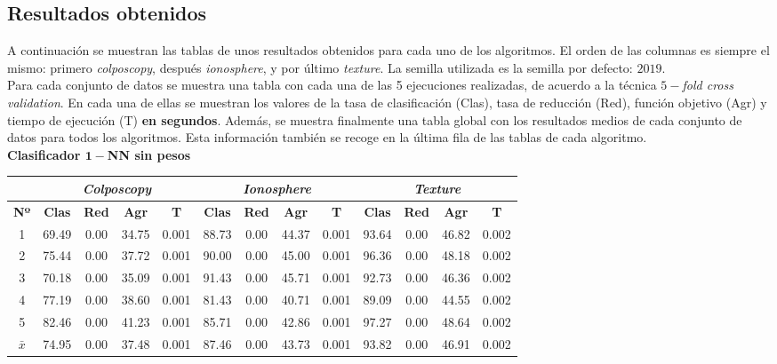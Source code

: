 \documentclass[12pt]{article}
\begin{document}
\subsection*{Resultados obtenidos}
\label{resultados}

A continuación se muestran las tablas de unos resultados obtenidos para cada uno de los algoritmos. El orden de las columnas es siempre el mismo: primero \textit{colposcopy}, después \textit{ionosphere}, y por último \textit{texture}. La semilla utilizada es la semilla por defecto: $2019$.\\

Para cada conjunto de datos se muestra una tabla con cada una de las 5 ejecuciones realizadas, de acuerdo a la técnica $5-$\textit{fold cross validation}. En cada una de ellas se muestran los valores de la tasa de clasificación (Clas), tasa de reducción (Red), función objetivo (Agr) y tiempo de ejecución (T) \textbf{en segundos}. Además, se muestra finalmente una tabla global con los resultados medios de cada conjunto de datos para todos los algoritmos. Esta información también se recoge en la última fila de las tablas de cada algoritmo.\\

{\color{red}\textbf{Clasificador $\boldsymbol{1-}$NN sin pesos}}

\begin{table}[h]
\begin{tabular}{ccccc|cccc|cccc}
 & \multicolumn{4}{c}{\textit{Colposcopy}} & \multicolumn{4}{c}{\textit{Ionosphere}} & \multicolumn{4}{c}{\textit{Texture}} \\ \hline
\textbf{Nº} & \textbf{Clas} & \textbf{Red} & \textbf{Agr} & \textbf{T} & \textbf{Clas} & \textbf{Red} & \textbf{Agr} & \textbf{T} & \textbf{Clas} & \textbf{Red} & \textbf{Agr} & \textbf{T} \\ \hline
1 & 69.49 & 0.00 & 34.75 & 0.001 & 88.73 & 0.00 & 44.37 & 0.001 & 93.64 & 0.00 & 46.82 & 0.002\\
2 & 75.44 & 0.00 & 37.72 & 0.001 & 90.00 & 0.00 & 45.00 & 0.001 & 96.36 & 0.00 & 48.18 & 0.002\\
3 & 70.18 & 0.00 & 35.09 & 0.001 & 91.43 & 0.00 & 45.71 & 0.001 & 92.73 & 0.00 & 46.36 & 0.002\\
4 & 77.19 & 0.00 & 38.60 & 0.001 & 81.43 & 0.00 & 40.71 & 0.001 & 89.09 & 0.00 & 44.55 & 0.002\\
5 & 82.46 & 0.00 & 41.23 & 0.001 & 85.71 & 0.00 & 42.86 & 0.001 & 97.27 & 0.00 & 48.64 & 0.002\\
\hline
$\bar{x}$  & 74.95 & 0.00 & 37.48 & 0.001 & 87.46 & 0.00 & 43.73 & 0.001 & 93.82 & 0.00 & 46.91 & 0.002
\end{tabular}
\end{table}
\end{document}

